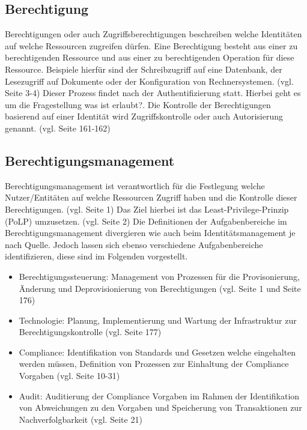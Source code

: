 \documentclass[11pt]{article}
\begin{document}
\subsection{Berechtigung}
Berechtigungen oder auch Zugriffsberechtigungen beschreiben welche Identitäten auf welche Ressourcen zugreifen dürfen. Eine Berechtigung besteht aus einer zu berechtigenden Ressource und aus einer zu berechtigenden Operation für diese Ressource. Beispiele hierfür sind der Schreibzugriff auf eine Datenbank, der Lesezugriff auf Dokumente oder der Konfiguration von Rechnersystemen. (vgl. \cite{tsolkas2017} Seite 3-4) Dieser Prozess findet nach der Authentifizierung statt. Hierbei geht es um die Fragestellung \glqq{}was ist erlaubt?\grqq{}. Die Kontrolle der Berechtigungen basierend auf einer Identität wird Zugriffskontrolle oder auch Autorisierung genannt. (vgl. \cite{tsolkas2017} Seite 161-162)
\subsection{Berechtigungsmanagement}
Berechtigungsmanagement ist verantwortlich für die Festlegung welche Nutzer/Entitäten auf welche Ressourcen Zugriff haben und die Kontrolle dieser Berechtigungen. (vgl. \cite{orp4} Seite 1) Das Ziel hierbei ist das Least-Privilege-Prinzip (PoLP) umzusetzen. (vgl. \cite{orp4} Seite 2) Die Definitionen der Aufgabenbereiche im Berechtigungsmanagement divergieren wie auch beim Identitätsmanagement je nach Quelle. Jedoch lassen sich ebenso verschiedene Aufgabenbereiche identifizieren, diese sind im Folgenden vorgestellt.
\begin{itemize}
  \item Berechtigungssteuerung: Management von Prozessen für die Provisonierung, Änderung und Deprovisionierung von Berechtigungen (vgl. \cite{orp4} Seite 1 und \cite{tsolkas2017} Seite 176)
  \item Technologie: Planung, Implementierung und Wartung der Infrastruktur zur Berechtigungskontrolle (vgl. \cite{tsolkas2017} Seite 177)
  \item Compliance: Identifikation von Standards und Gesetzen welche eingehalten werden müssen, Definition von Prozessen zur Einhaltung der Compliance Vorgaben (vgl. \cite{conta2017leitfaden} Seite 10-31)
  \item Audit: Auditierung der Compliance Vorgaben im Rahmen der Identifikation von Abweichungen zu den Vorgaben und Speicherung von Transaktionen zur Nachverfolgbarkeit (vgl. \cite{tsolkas2017} Seite 21)
\end{itemize}
\end{document}
